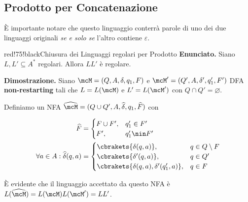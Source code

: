 \subsection{Prodotto per Concatenazione}


È importante notare che questo linguaggio conterrà parole di uno dei due linguaggi originali \textit{se e solo se} l'altro contiene \(\varepsilon\).

\begin{halfframedbox}{red!75!black}{Chiusura dei Linguaggi regolari per Prodotto}
  \textbf{Enunciato. } Siano \(L,L' \subseteq A^*\) regolari. Allora \(LL'\) è regolare.

  \begin{center}
    \textcolor{red!75!black}{\hdashrule[0.5ex]{18cm}{1pt}{3mm 3pt 1mm 2pt}}
  \end{center}

  \textbf{Dimostrazione. } Siano \(\mcM=(Q,A,\delta,q_1,F)\) e \(\mcM'=(Q',A,\delta',q_1',F')\) DFA \textbf{non-restarting} tali che \(L=L(\mcM)\) e \(L'=L(\mcM')\) con \(Q \cap Q' = \varnothing\).

  Definiamo un NFA \(\widehat{\mcM}=(Q\cup Q', A, \widehat{\delta}, q_1, \widehat{F})\) con

  \begin{equation}
    \begin{split}
      \widehat{F}&=\begin{cases}
        F\cup F', & q_1' \in F'\\
        F', & q_1' \nin F'\\
      \end{cases} \\
      \forall a \in A: \widehat{\delta}(q,a)&=\begin{cases}
        \cbrakets{\delta(q,a)}, & q \in Q \setminus F\\
        \cbrakets{\delta'(q,a)}, & q \in Q' \\
        \cbrakets{\delta(q,a), \delta'(q_1',a)}, & q\in F
      \end{cases}
    \end{split}
  \end{equation}

  È evidente che il linguaggio accettato da questo NFA è \(L(\widehat{\mcM})=L(\mcM)L(\mcM')=LL'\).

\end{halfframedbox}

